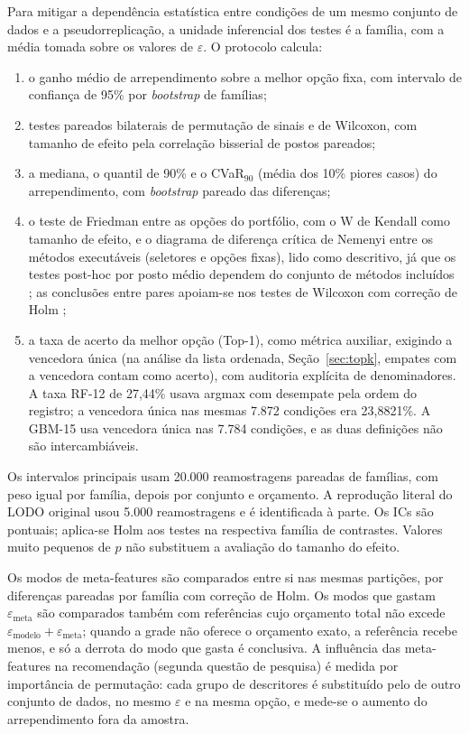 Para mitigar a dependência estatística entre condições de um mesmo conjunto de dados e a pseudorreplicação, a unidade inferencial dos testes é a família, com a média tomada sobre os valores de $\varepsilon$. O protocolo calcula:
\begin{enumerate}
    \item o ganho médio de arrependimento sobre a melhor opção fixa, com intervalo de confiança de 95\% por \textit{bootstrap} de famílias;
    \item testes pareados bilaterais de permutação de sinais e de Wilcoxon, com tamanho de efeito pela correlação bisserial de postos pareados;
    \item a mediana, o quantil de 90\% e o CVaR$_{90}$ (média dos 10\% piores casos) \cite{ref92} do arrependimento, com \textit{bootstrap} pareado das diferenças;
    \item o teste de Friedman entre as opções do portfólio, com o W de Kendall como tamanho de efeito, e o diagrama de diferença crítica de Nemenyi entre os métodos executáveis (seletores e opções fixas), lido como descritivo, já que os testes post-hoc por posto médio dependem do conjunto de métodos incluídos \cite{ref95}; as conclusões entre pares apoiam-se nos testes de Wilcoxon com correção de Holm \cite{ref93};
    \item a taxa de acerto da melhor opção (Top-1), como métrica auxiliar, exigindo a vencedora única (na análise da lista ordenada, Seção~\ref{sec:topk}, empates com a vencedora contam como acerto), com auditoria explícita de denominadores. A taxa RF-12 de 27,44\% usava argmax com desempate pela ordem do registro; a vencedora única nas mesmas 7.872 condições era 23,8821\%. A GBM-15 usa vencedora única nas 7.784 condições, e as duas definições não são intercambiáveis.
\end{enumerate}
Os intervalos principais usam 20.000 reamostragens pareadas de famílias, com peso igual por família, depois por conjunto e orçamento. A reprodução literal do LODO original usou 5.000 reamostragens e é identificada à parte. Os ICs são pontuais; aplica-se Holm aos testes na respectiva família de contrastes. Valores muito pequenos de $p$ não substituem a avaliação do tamanho do efeito.

Os modos de meta-features são comparados entre si nas mesmas partições, por diferenças pareadas por família com correção de Holm. Os modos que gastam $\varepsilon_{\text{meta}}$ são comparados também com referências cujo orçamento total não excede $\varepsilon_{\text{modelo}}+\varepsilon_{\text{meta}}$; quando a grade não oferece o orçamento exato, a referência recebe menos, e só a derrota do modo que gasta é conclusiva. A influência das meta-features na recomendação (segunda questão de pesquisa) é medida por importância de permutação: cada grupo de descritores é substituído pelo de outro conjunto de dados, no mesmo $\varepsilon$ e na mesma opção, e mede-se o aumento do arrependimento fora da amostra.

